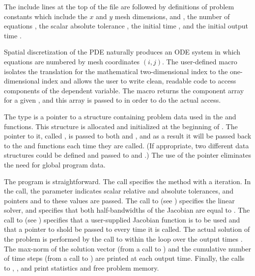 The include lines at the top of the file are followed by definitions of
problem constants which include the $x$ and $y$ mesh dimensions,  and
, the number of equations , the scalar absolute tolerance
, the initial time , and the initial output time .

Spatial discretization of the PDE naturally produces an ODE system in
which equations are numbered by mesh coordinates $(i,j)$. The
user-defined macro  isolates the translation for the
mathematical two-dimensional index to the one-dimensional
 index and allows the user to write clean, readable code
to access components of the dependent variable.  The 
macro returns the component array for a given , and this
array is passed to  in order to do the actual 
access.

The type  is a pointer to a structure containing problem
data used in the  and  functions.  This structure is
allocated and initialized at the beginning of . The pointer
to it, called , is passed to both  and
, and as a result it will be passed back to the
 and  functions each time they are called.  (If
appropriate, two different data structures could be defined and passed
to  and .)  The use of the  pointer eliminates
the need for global program data.

The  program is straightforward.  The  call
specifies the  method with a  iteration. In the
 call, the parameter  indicates scalar relative
and absolute tolerances, and pointers  and  to
these values are passed.  
The call to  (see ) specifies the {\cvband}
linear solver, and specifies that both half-bandwidths of the Jacobian
are equal to .  
The call to  (see ) specifies
that a user-supplied Jacobian function  is to be used and that a
pointer to  shold be passed to  every time it is called.
The actual solution of the problem is performed by
the call to  within the loop over the output times .
The max-norm of the solution vector (from a call to ) and
the cumulative number of time steps (from a call to ) are
printed at each output time. Finally, the calls to ,
, and  print statistics and free problem memory.


